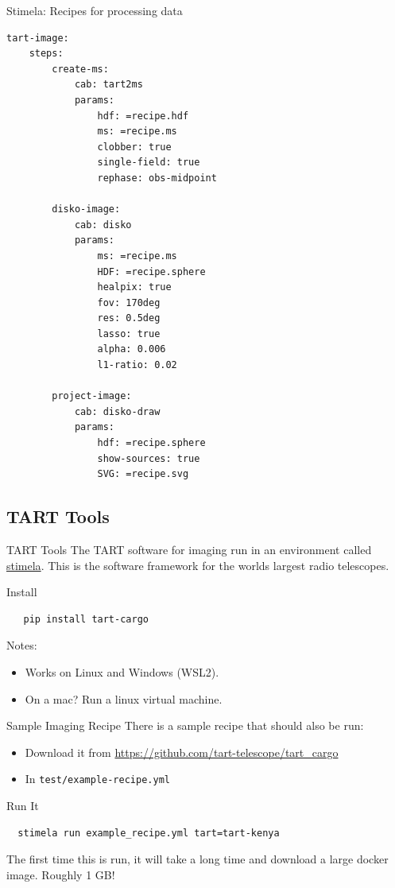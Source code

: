 \documentclass[ignorenonframetext]{beamer}
\begin{document}
\begin{frame}[fragile]{Stimela: Recipes for processing data}

\begin{lstlisting}[style=yaml]
tart-image:
    steps:
        create-ms:
            cab: tart2ms
            params:
                hdf: =recipe.hdf
                ms: =recipe.ms
                clobber: true
                single-field: true
                rephase: obs-midpoint

        disko-image:
            cab: disko
            params:
                ms: =recipe.ms
                HDF: =recipe.sphere
                healpix: true
                fov: 170deg
                res: 0.5deg
                lasso: true
                alpha: 0.006
                l1-ratio: 0.02

        project-image:
            cab: disko-draw
            params:
                hdf: =recipe.sphere
                show-sources: true
                SVG: =recipe.svg
\end{lstlisting}
\end{frame}
\subsection{TART Tools}

\begin{frame}[fragile]{TART Tools}
  The TART software for imaging run in an environment called \href{https://github.com/caracal-pipeline/stimela}{stimela}. This is the software framework for the worlds largest radio telescopes.

  \begin{block}{Install}
  \begin{verbatim}
   pip install tart-cargo
  \end{verbatim}
  \end{block}

  Notes:
  \begin{itemize}
   \item Works on Linux and Windows (WSL2).
   \item On a mac? Run a linux virtual machine.
  \end{itemize}

\end{frame}


\begin{frame}[fragile]{Sample Imaging Recipe}
There is a sample recipe that should also be run:
\begin{itemize}
 \item Download it from \url{https://github.com/tart-telescope/tart_cargo}
 \item In \verb!test/example-recipe.yml!
\end{itemize}
\begin{block}{Run It}
 \begin{verbatim}
  stimela run example_recipe.yml tart=tart-kenya
 \end{verbatim}
\end{block}
 The first time this is run, it will take a long time and download a large docker image. Roughly 1 GB!
\end{frame}
\end{document}
